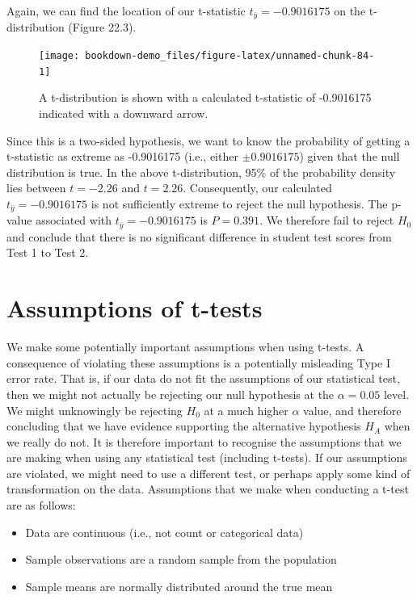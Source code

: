\documentclass[
  openany]{scrbook}
\providecommand{\tightlist}{%
  \setlength{\itemsep}{0pt}\setlength{\parskip}{0pt}}
\begin{document}
Again, we can find the location of our t-statistic \(t_{\bar{y}} = -0.9016175\) on the t-distribution (Figure 22.3).

\begin{figure}
\texttt{[image: bookdown-demo\_files/figure-latex/unnamed-chunk-84-1]} \caption{A t-distribution is shown with a calculated t-statistic of -0.9016175 indicated with a downward arrow.}\label{fig:unnamed-chunk-84}
\end{figure}

Since this is a two-sided hypothesis, we want to know the probability of getting a t-statistic as extreme as -0.9016175 (i.e., either \(\pm 0.9016175\)) given that the null distribution is true.
In the above t-distribution, 95\% of the probability density lies between \(t = -2.26\) and \(t = 2.26\).
Consequently, our calculated \(t_{\bar{y}} = -0.9016175\) is not sufficiently extreme to reject the null hypothesis.
The p-value associated with \(t_{\bar{y}} = -0.9016175\) is \(P = 0.391\).
We therefore fail to reject \(H_{0}\) and conclude that there is no significant difference in student test scores from Test 1 to Test 2.

\hypertarget{assumptions-of-t-tests}{%
\section{Assumptions of t-tests}\label{assumptions-of-t-tests}}

We make some potentially important assumptions when using t-tests.
A consequence of violating these assumptions is a potentially misleading Type I error rate.
That is, if our data do not fit the assumptions of our statistical test, then we might not actually be rejecting our null hypothesis at the \(\alpha = 0.05\) level.
We might unknowingly be rejecting \(H_{0}\) at a much higher \(\alpha\) value, and therefore concluding that we have evidence supporting the alternative hypothesis \(H_{A}\) when we really do not.
It is therefore important to recognise the assumptions that we are making when using any statistical test (including t-tests).
If our assumptions are violated, we might need to use a different test, or perhaps apply some kind of transformation on the data.
Assumptions that we make when conducting a t-test are as follows:

\begin{itemize}
\tightlist
\item
  Data are continuous (i.e., not count or categorical data)
\item
  Sample observations are a random sample from the population
\item
  Sample means are normally distributed around the true mean
\end{itemize}
\end{document}
